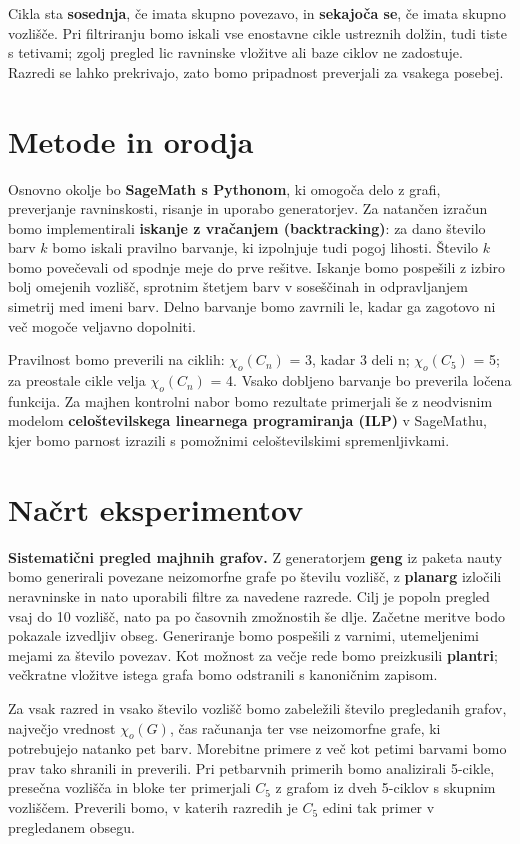 \documentclass[10pt,a4paper]{article}
\begin{document}
Cikla sta \textbf{sosednja}, če imata skupno povezavo, in \textbf{sekajoča se}, če imata skupno vozlišče. Pri filtriranju bomo iskali vse enostavne cikle ustreznih dolžin, tudi tiste s tetivami; zgolj pregled lic ravninske vložitve ali baze ciklov ne zadostuje. Razredi se lahko prekrivajo, zato bomo pripadnost preverjali za vsakega posebej.

\section*{Metode in orodja}

Osnovno okolje bo \textbf{SageMath s Pythonom}, ki omogoča delo z grafi, preverjanje ravninskosti, risanje in uporabo generatorjev. Za natančen izračun bomo implementirali \textbf{iskanje z vračanjem (backtracking)}: za dano število barv $k$ bomo iskali pravilno barvanje, ki izpolnjuje tudi pogoj lihosti. Število $k$ bomo povečevali od spodnje meje do prve rešitve. Iskanje bomo pospešili z izbiro bolj omejenih vozlišč, sprotnim štetjem barv v soseščinah in odpravljanjem simetrij med imeni barv. Delno barvanje bomo zavrnili le, kadar ga zagotovo ni več mogoče veljavno dopolniti.

Pravilnost bomo preverili na ciklih: $\chi_o(C_n)$ = 3, kadar 3 deli n; $\chi_o(C_5)$ = 5; za preostale cikle velja $\chi_o(C_n)$ = 4. Vsako dobljeno barvanje bo preverila ločena funkcija. Za majhen kontrolni nabor bomo rezultate primerjali še z neodvisnim modelom \textbf{celoštevilskega linearnega programiranja (ILP)} v SageMathu, kjer bomo parnost izrazili s pomožnimi celoštevilskimi spremenljivkami.

\newpage

\section*{Načrt eksperimentov}

\textbf{Sistematični pregled majhnih grafov.} Z generatorjem \textbf{geng} iz paketa nauty bomo generirali povezane neizomorfne grafe po številu vozlišč, z \textbf{planarg} izločili neravninske in nato uporabili filtre za navedene razrede. Cilj je popoln pregled vsaj do 10 vozlišč, nato pa po časovnih zmožnostih še dlje. Začetne meritve bodo pokazale izvedljiv obseg. Generiranje bomo pospešili z varnimi, utemeljenimi mejami za število povezav. Kot možnost za večje rede bomo preizkusili \textbf{plantri}; večkratne vložitve istega grafa bomo odstranili s kanoničnim zapisom.

Za vsak razred in vsako število vozlišč bomo zabeležili število pregledanih grafov, največjo vrednost $\chi_o(G)$, čas računanja ter vse neizomorfne grafe, ki potrebujejo natanko pet barv. Morebitne primere z več kot petimi barvami bomo prav tako shranili in preverili. Pri petbarvnih primerih bomo analizirali 5-cikle, presečna vozlišča in bloke ter primerjali $C_5$ z grafom iz dveh 5-ciklov s skupnim vozliščem. Preverili bomo, v katerih razredih je $C_5$ edini tak primer v pregledanem obsegu.
\end{document}
